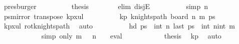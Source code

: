 \begin{isabellebody}
\ presburger\isanewline
\ \ \ \ \ \ \isamarkupfalse%
\ \isamarkupfalse%
\ {\isacharquery}{\kern0pt}thesis\isanewline
\ \ \ \ \ \ \isamarkupfalse%
\ {\isacharparenleft}{\kern0pt}elim\ disjE{\isacharparenright}{\kern0pt}\isanewline
\ \ \ \ \ \ \ \ \isamarkupfalse%
\ {\isacharbrackleft}{\kern0pt}simp{\isacharbrackright}{\kern0pt}{\isacharcolon}{\kern0pt}\ {\isachardoublequoteopen}n\ {\isacharequal}{\kern0pt}\ {}{\isachardoublequoteclose}\isanewline
\ \ \ \ \ \ \ \ \isamarkupfalse%
\ {\isacharquery}{\kern0pt}ps{\isacharequal}{\kern0pt}{\isachardoublequoteopen}mirror{}\ {\isacharparenleft}{\kern0pt}transpose\ kp{}x{}ul{\isacharparenright}{\kern0pt}{\isachardoublequoteclose}\isanewline
\ \ \ \ \ \ \ \ \isamarkupfalse%
\ kp{\isacharcolon}{\kern0pt}\ {\isachardoublequoteopen}knights{\isacharunderscore}{\kern0pt}path\ {\isacharparenleft}{\kern0pt}board\ n\ m{\isacharparenright}{\kern0pt}\ {\isacharquery}{\kern0pt}ps{\isachardoublequoteclose}\isanewline
\ \ \ \ \ \ \ \ \ \ \isamarkupfalse%
\ kp{\isacharunderscore}{\kern0pt}{}x{}{\isacharunderscore}{\kern0pt}ul\ rot{}{}{\isacharunderscore}{\kern0pt}knights{\isacharunderscore}{\kern0pt}path\ \isamarkupfalse%
\ auto\isanewline
\ \ \ \ \ \ \ \ \isamarkupfalse%
\ {\isachardoublequoteopen}hd\ {\isacharquery}{\kern0pt}ps\ {\isacharequal}{\kern0pt}\ {\isacharparenleft}{\kern0pt}int\ n{\isacharcomma}{\kern0pt}{}{\isacharparenright}{\kern0pt}{\isachardoublequoteclose}\ {\isachardoublequoteopen}last\ {\isacharquery}{\kern0pt}ps\ {\isacharequal}{\kern0pt}\ {\isacharparenleft}{\kern0pt}int\ n{\isacharminus}{\kern0pt}{}{\isacharcomma}{\kern0pt}int\ m{\isacharminus}{\kern0pt}{}{\isacharparenright}{\kern0pt}{\isachardoublequoteclose}\isanewline
\ \ \ \ \ \ \ \ \ \ \isamarkupfalse%
\ {\isacharparenleft}{\kern0pt}simp\ only{\isacharcolon}{\kern0pt}\ {\isacartoucheopen}m\ {\isacharequal}{\kern0pt}\ {}{\isacartoucheclose}\ {\isacartoucheopen}n\ {\isacharequal}{\kern0pt}\ {}{\isacartoucheclose}\ {\isacharbar}{\kern0pt}\ eval{\isacharparenright}{\kern0pt}{\isacharplus}{\kern0pt}\isanewline
\ \ \ \ \ \ \ \ \isamarkupfalse%
\ \isamarkupfalse%
\ {\isacharquery}{\kern0pt}thesis\ \isamarkupfalse%
\ kp\ \isamarkupfalse%
\ auto\isanewline
\ \ \ \ \ \ \isamarkupfalse%

\end{isabellebody}
